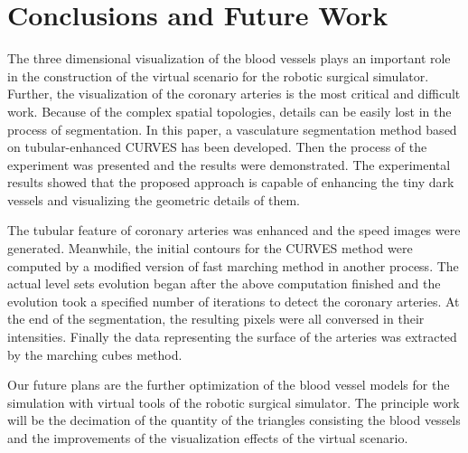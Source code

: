 
\section{Conclusions and Future Work}
\label{sec4_4}

The three dimensional visualization of the blood vessels plays an important role in the construction of the virtual scenario for the robotic surgical simulator.
Further, the visualization of the coronary arteries is the most critical and difficult work.
Because of the complex spatial topologies, details can be easily lost in the process of segmentation.
In this paper, a vasculature segmentation method based on tubular-enhanced CURVES has been developed.
Then the process of the experiment was presented and the results were demonstrated.
The experimental results showed that the proposed approach is capable of enhancing the tiny dark vessels and visualizing the geometric details of them.

The tubular feature of coronary arteries was enhanced and the speed images were generated.
Meanwhile, the initial contours for the CURVES method were computed by a modified version of fast marching method in another process.
The actual level sets evolution began after the above computation finished and the evolution took a specified number of iterations to detect the coronary arteries.
At the end of the segmentation, the resulting pixels were all conversed in their intensities.
Finally the data representing the surface of the arteries was extracted by the marching cubes method.

Our future plans are the further optimization of the blood vessel models for the simulation with virtual tools of the robotic surgical simulator.
The principle work will be the decimation of the quantity of the triangles consisting the blood vessels and the improvements of the visualization effects of the virtual scenario. 